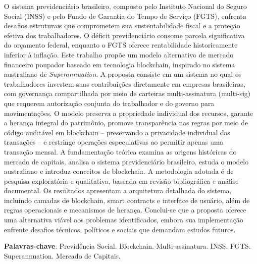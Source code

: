 O sistema previdenciário brasileiro, composto pelo Instituto Nacional do Seguro Social (INSS) e pelo Fundo de Garantia do Tempo de Serviço (FGTS), enfrenta desafios estruturais que comprometem sua sustentabilidade fiscal e a proteção efetiva dos trabalhadores. O déficit previdenciário consome parcela significativa do orçamento federal, enquanto o FGTS oferece rentabilidade historicamente inferior à inflação. Este trabalho propõe um modelo alternativo de mercado financeiro poupador baseado em tecnologia blockchain, inspirado no sistema australiano de \textit{Superannuation}. A proposta consiste em um sistema no qual os trabalhadores investem suas contribuições diretamente em empresas brasileiras, com governança compartilhada por meio de carteiras multi-assinatura (multi-sig) que requerem autorização conjunta do trabalhador e do governo para movimentações. O modelo preserva a propriedade individual dos recursos, garante a herança integral do patrimônio, promove transparência nas regras por meio de código auditável em blockchain -- preservando a privacidade individual das transações -- e restringe operações especulativas ao permitir apenas uma transação mensal. A fundamentação teórica examina as origens históricas do mercado de capitais, analisa o sistema previdenciário brasileiro, estuda o modelo australiano e introduz conceitos de blockchain. A metodologia adotada é de pesquisa exploratória e qualitativa, baseada em revisão bibliográfica e análise documental. Os resultados apresentam a arquitetura detalhada do sistema, incluindo camadas de blockchain, smart contracts e interface de usuário, além de regras operacionais e mecanismos de herança. Conclui-se que a proposta oferece uma alternativa viável aos problemas identificados, embora sua implementação enfrente desafios técnicos, políticos e sociais que demandam estudos futuros.

\vspace{\onelineskip}
\noindent\textbf{Palavras-chave}: Previdência Social. Blockchain. Multi-assinatura. INSS. FGTS. Superannuation. Mercado de Capitais.
